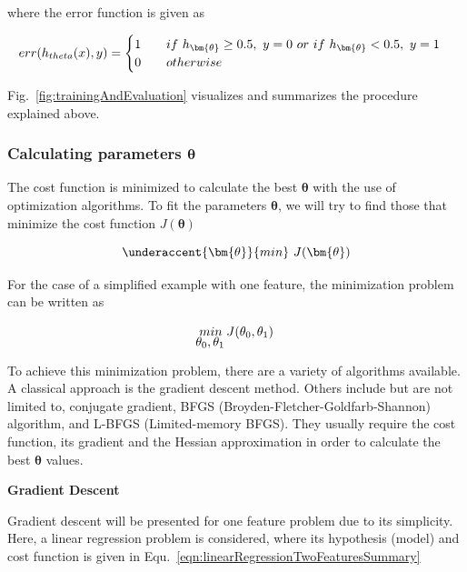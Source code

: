 \begin{enumerate}
	where the error function is given as

	\begin{equation}{\label{eqn:misclassificationError}}
	  err(h_{theta}(x),y)=\begin{cases}
               1 \qquad if\ h_{{\bm{\theta}}}\geq0.5,\ y=0 \ or\ if \ h_{{\bm{\theta}}} < 0.5, \ y=1\\
               0 \qquad otherwise\\
            \end{cases}
	\end{equation} 

\end{enumerate}

Fig.~\ref{fig:trainingAndEvaluation} visualizes and summarizes the procedure explained above.

\subsubsection{Calculating parameters $\bm{\theta}$}

The cost function is minimized to calculate the best $\bm{\theta}$ with the use of optimization algorithms. To fit the parameters $\bm{\theta}$, we will try to find those that minimize the cost function $J({\bm{\theta}})$

\begin{equation}{\label{eqn:optimizationGoal}}
\underaccent{{\displaystyle \bm{\theta}}}{min} \ J(\bm{\theta})
\end{equation} 

For the case of a simplified example with one feature, the minimization problem can be written as

\begin{equation}{\label{eqn:optimizationGoalSimplified}}
\underaccent{{\displaystyle \theta_0, \theta_1}}{min} \ J(\theta_0,\theta_1)
\end{equation} 

To achieve this minimization problem, there are a variety of algorithms available. 
A classical approach is the gradient descent method.  
Others include but are not limited to, conjugate gradient, BFGS (Broyden-Fletcher-Goldfarb-Shannon) algorithm, and L-BFGS (Limited-memory BFGS). 
They usually require the cost function, its gradient and the Hessian approximation in order to calculate the best $\bm{\theta}$ values.

\textbf{Gradient Descent}

Gradient descent will be presented for one feature problem due to its simplicity. 
Here, a linear regression problem is considered, where its hypothesis (model) and cost function is given in Equ.~\ref{eqn:linearRegressionTwoFeaturesSummary}

